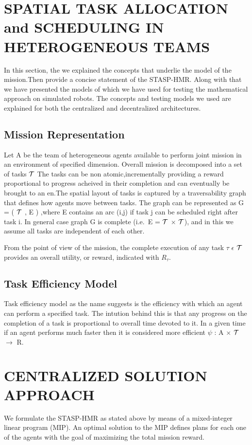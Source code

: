 \documentclass[conference]{IEEEtran}
\begin{document}
\section{SPATIAL TASK ALLOCATION and SCHEDULING IN HETEROGENEOUS TEAMS}
In this section, the we explained the concepts that underlie the model of the mission.Then provide a concise statement of the STASP-HMR. Along with that we have presented the models of which we have used for testing the mathematical approach on simulated robots. The concepts and testing models we used are explained for both the centralized and decentralized architectures. 
\subsection{Mission Representation}
Let A be the team of heterogeneous agents available to perform joint mission in an environment of specified dimension. Overall mission is decomposed into a set of tasks \( \mathcal{T} \) The tasks can be non atomic,incrementally providing a reward proportional to progress acheived in their completion and can eventually be brought to an en.The spatial layout of tasks is captured by a traversability graph that defines how agents move between tasks\cite{feo2016decentralized}.
The graph can be represented as G = ( \( \mathcal{T} \) , E ) ,where E contains an arc (i,j) if task j can be scheduled right after task i. In general case graph G is complete (i.e.\, E = \( \mathcal{T} \) \( \times \) \( \mathcal{T} \)), and in this we assume all tasks are independent of each other.

From the point of view of the mission, the complete execution of any task \( \tau \) \( \epsilon \) \( \mathcal{T} \) provides an overall utility, or reward, indicated with \( R_{\tau} \).

\subsection{Task Efficiency Model}
Task efficiency model as the name suggests is the efficiency with which an agent can perform a specified task. The intution behind this is that any progress on the completion of a task is proportional to overall time devoted to it. In a given time if an agent performs much faster then it is considered more efficient \( \psi \) : A \( \times \) \( \mathcal{T} \) \( \to \) {R}\cite{feo2016decentralized}. 

\section{CENTRALIZED SOLUTION APPROACH}
We formulate the STASP-HMR as stated above by means of a mixed-integer linear program (MIP). An optimal solution to the MIP defines plans for each one of the agents with the goal of maximizing the total mission reward.
\end{document}
